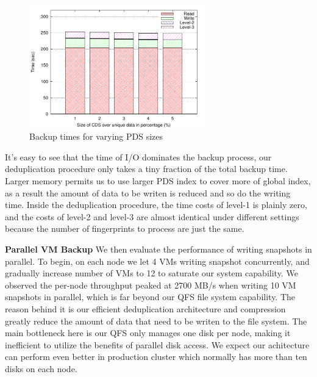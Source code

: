 \begin{figure}
    \centering
    \includegraphics[width=3in]{figures/single_backup_time}
    \caption{Backup times for varying PDS sizes}
    \label{fig:single_vm_backup}
\end{figure}

It's easy to see that the time of I/O dominates the backup process, our deduplication
procedure only takes a tiny fraction of the total backup time. Larger memory permits us to
use larger PDS index to cover more of global index, as a result the amount of data to be writen
is reduced and so do the writing time.
Inside the deduplication procedure, the time costs of level-1
is plainly zero, and the costs of level-2 and level-3 are almost identical under different settings
because the number of fingerprints to process are just the same.

{\bf Parallel VM Backup} We then evaluate the performance of writing snapshots in parallel.
To begin, on each node we let 4 VMs writing snapshot concurrently, and gradually 
increase number of VMs to 12 to saturate our system capability. We observed 
the per-node throughput peaked at 2700 MB/s when writing 10 VM snapshots in parallel, 
which is far beyond our QFS file system capability. The reason behind it is our efficient
deduplication architecture and compression greatly reduce the amount of data that need to be writen to
the file system. The main bottleneck here is our QFS only manages one disk per node, 
making it inefficient to utilize the benefits of parallel disk access. We expect our achitecture can
perform even better in production cluster which normally has more than ten disks on each node.

